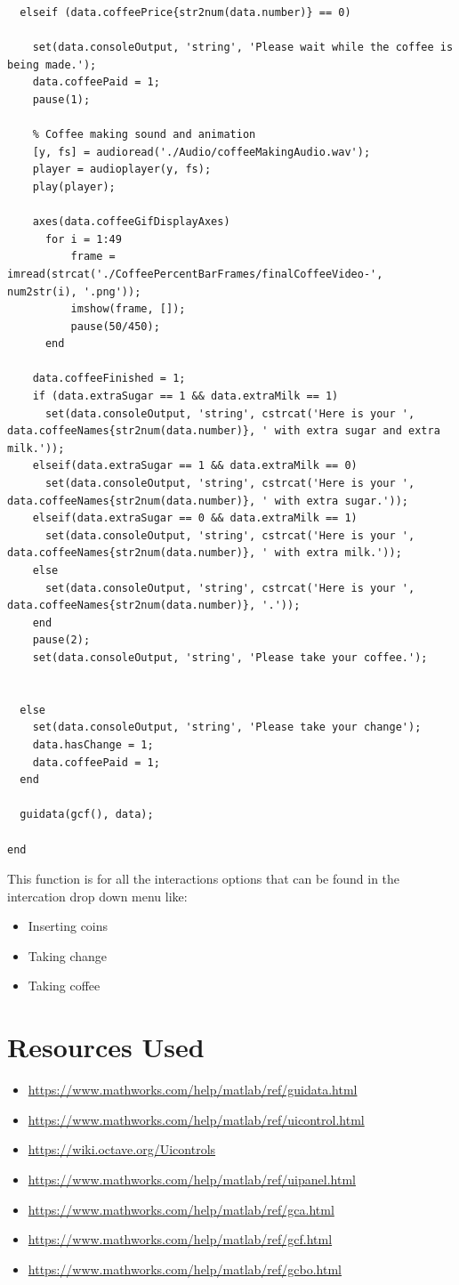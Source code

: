\documentclass[a4paper, 10pt]{article}
\begin{document}
\begin{lstlisting}
  elseif (data.coffeePrice{str2num(data.number)} == 0)

    set(data.consoleOutput, 'string', 'Please wait while the coffee is being made.');
    data.coffeePaid = 1;
    pause(1);

    % Coffee making sound and animation
    [y, fs] = audioread('./Audio/coffeeMakingAudio.wav');
    player = audioplayer(y, fs);
    play(player);

    axes(data.coffeeGifDisplayAxes)
	  for i = 1:49
		  frame = imread(strcat('./CoffeePercentBarFrames/finalCoffeeVideo-', num2str(i), '.png'));
		  imshow(frame, []);
		  pause(50/450);
	  end

    data.coffeeFinished = 1;
    if (data.extraSugar == 1 && data.extraMilk == 1)
      set(data.consoleOutput, 'string', cstrcat('Here is your ', data.coffeeNames{str2num(data.number)}, ' with extra sugar and extra milk.'));
    elseif(data.extraSugar == 1 && data.extraMilk == 0)
      set(data.consoleOutput, 'string', cstrcat('Here is your ', data.coffeeNames{str2num(data.number)}, ' with extra sugar.'));
    elseif(data.extraSugar == 0 && data.extraMilk == 1)
      set(data.consoleOutput, 'string', cstrcat('Here is your ', data.coffeeNames{str2num(data.number)}, ' with extra milk.'));
    else
      set(data.consoleOutput, 'string', cstrcat('Here is your ', data.coffeeNames{str2num(data.number)}, '.'));
    end
    pause(2);
    set(data.consoleOutput, 'string', 'Please take your coffee.');


  else
    set(data.consoleOutput, 'string', 'Please take your change');
    data.hasChange = 1;
    data.coffeePaid = 1;
  end

  guidata(gcf(), data);

end
			\end{lstlisting}

			\noindent This function is for all the interactions options that can be found in the intercation drop down menu like:
			\begin{itemize}
				\item Inserting coins
				\item Taking change
				\item Taking coffee 
			\end{itemize}
	\section{Resources Used}
		\begin{itemize}
			\item \url{https://www.mathworks.com/help/matlab/ref/guidata.html}
			\item \url{https://www.mathworks.com/help/matlab/ref/uicontrol.html}
			\item \url{https://wiki.octave.org/Uicontrols}
			\item \url{https://www.mathworks.com/help/matlab/ref/uipanel.html}
			\item \url{https://www.mathworks.com/help/matlab/ref/gca.html}
			\item \url{https://www.mathworks.com/help/matlab/ref/gcf.html}
			\item \url{https://www.mathworks.com/help/matlab/ref/gcbo.html}
		\end{itemize}
\end{document}
